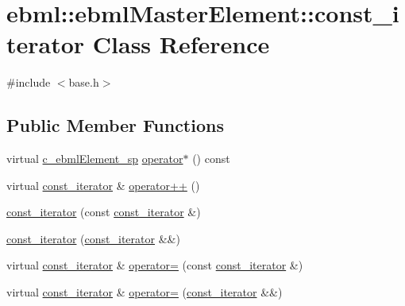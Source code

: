 \hypertarget{classebml_1_1ebmlMasterElement_1_1const__iterator}{}\section{ebml\+:\+:ebml\+Master\+Element\+:\+:const\+\_\+iterator Class Reference}
\label{classebml_1_1ebmlMasterElement_1_1const__iterator}


{\ttfamily \#include $<$base.\+h$>$}

\subsection*{Public Member Functions}
\begin{DoxyCompactItemize}
\item 
virtual \mbox{\hyperlink{namespaceebml_a2deef4e8071531b32e3533f1bf978917}{c\+\_\+ebml\+Element\+\_\+sp}} \mbox{\hyperlink{classebml_1_1ebmlMasterElement_1_1const__iterator_ae661352a7787687258bc749a70a2811b}{operator$\ast$}} () const
\item 
virtual \mbox{\hyperlink{classebml_1_1ebmlMasterElement_1_1const__iterator}{const\+\_\+iterator}} \& \mbox{\hyperlink{classebml_1_1ebmlMasterElement_1_1const__iterator_ae9f1b67c2ac0023a09f2816aaf7e9c71}{operator++}} ()
\item 
\mbox{\hyperlink{classebml_1_1ebmlMasterElement_1_1const__iterator_ac594446dbd101995ebaedafab5c046d9}{const\+\_\+iterator}} (const \mbox{\hyperlink{classebml_1_1ebmlMasterElement_1_1const__iterator}{const\+\_\+iterator}} \&)
\item 
\mbox{\hyperlink{classebml_1_1ebmlMasterElement_1_1const__iterator_a1d8c8bf8d5a96b1f118eb9ae68f503cf}{const\+\_\+iterator}} (\mbox{\hyperlink{classebml_1_1ebmlMasterElement_1_1const__iterator}{const\+\_\+iterator}} \&\&)
\item 
virtual \mbox{\hyperlink{classebml_1_1ebmlMasterElement_1_1const__iterator}{const\+\_\+iterator}} \& \mbox{\hyperlink{classebml_1_1ebmlMasterElement_1_1const__iterator_a7dcc9b3cf92c001873dca1bd265acba6}{operator=}} (const \mbox{\hyperlink{classebml_1_1ebmlMasterElement_1_1const__iterator}{const\+\_\+iterator}} \&)
\item 
virtual \mbox{\hyperlink{classebml_1_1ebmlMasterElement_1_1const__iterator}{const\+\_\+iterator}} \& \mbox{\hyperlink{classebml_1_1ebmlMasterElement_1_1const__iterator_a4e233e2546197fc96bc6d7c1fb31a30d}{operator=}} (\mbox{\hyperlink{classebml_1_1ebmlMasterElement_1_1const__iterator}{const\+\_\+iterator}} \&\&)

\end{DoxyCompactItemize}
